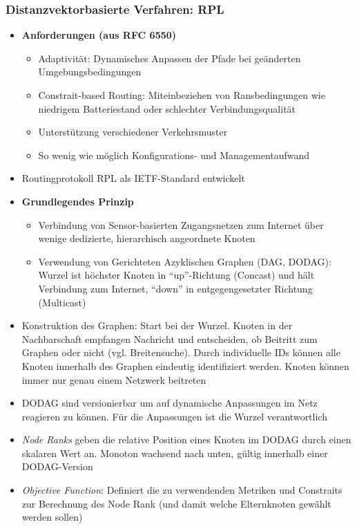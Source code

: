 \subsubsection{Distanzvektorbasierte Verfahren: RPL}
\begin{itemize}
	\item \textbf{Anforderungen (aus RFC 6550)}
	\begin{itemize}
		\item Adaptivität: Dynamisches Anpassen der Pfade bei geänderten Umgebungsbedingungen
		\item Constrait-based Routing: Miteinbeziehen von Ransbedingungen wie niedrigem Batteriestand oder schlechter Verbindungsqualität
		\item Unterstützung verschiedener Verkehrsmuster
		\item So wenig wie möglich Konfigurations- und Managementaufwand
	\end{itemize}
	\item Routingprotokoll RPL als IETF-Standard entwickelt
	\item \textbf{Grundlegendes Prinzip}
	\begin{itemize}
		\item Verbindung von Sensor-basierten Zugangsnetzen zum Internet über wenige dedizierte, hierarchisch angeordnete Knoten
		\item Verwendung von Gerichteten Azyklischen Graphen (DAG, DODAG): Wurzel ist höchster Knoten in "`up"'-Richtung (Concast) und hält Verbindung zum Internet, "`down"' in entgegengesetzter Richtung (Multicast)
	\end{itemize}
	\item Konstruktion des Graphen: Start bei der Wurzel. Knoten in der Nachbarschaft empfangen Nachricht und entscheiden, ob Beitritt zum Graphen oder nicht (vgl. Breitensuche). Durch individuelle IDs können alle Knoten innerhalb des Graphen eindeutig identifiziert werden. Knoten können immer nur genau einem Netzwerk beitreten
	\item DODAG sind versionierbar um auf dynamische Anpassungen im Netz reagieren zu können. Für die Anpassungen ist die Wurzel verantwortlich
	\item \textit{Node Ranks} geben die relative Position eines Knoten im DODAG durch einen skalaren Wert an. Monoton wachsend nach unten, gültig innerhalb einer DODAG-Version
	\item \textit{Objective Function}: Definiert die zu verwendenden Metriken und Constraits zur Berechnung des Node Rank (und damit welche Elternknoten gewählt werden sollen)

\end{itemize}
